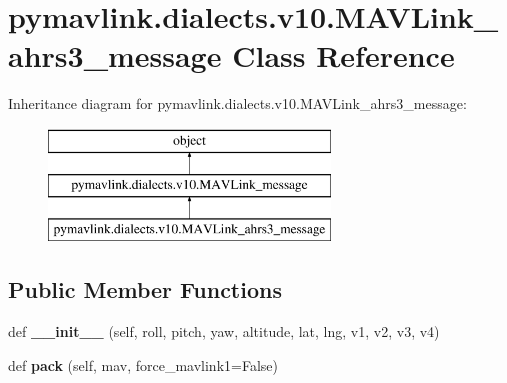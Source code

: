 \hypertarget{classpymavlink_1_1dialects_1_1v10_1_1MAVLink__ahrs3__message}{}\section{pymavlink.\+dialects.\+v10.\+M\+A\+V\+Link\+\_\+ahrs3\+\_\+message Class Reference}
\label{classpymavlink_1_1dialects_1_1v10_1_1MAVLink__ahrs3__message}
Inheritance diagram for pymavlink.\+dialects.\+v10.\+M\+A\+V\+Link\+\_\+ahrs3\+\_\+message\+:\begin{figure}[H]
\begin{center}
\leavevmode
\includegraphics[height=3.000000cm]{classpymavlink_1_1dialects_1_1v10_1_1MAVLink__ahrs3__message}
\end{center}
\end{figure}
\subsection*{Public Member Functions}
\begin{DoxyCompactItemize}
\item 
\mbox{\label{classpymavlink_1_1dialects_1_1v10_1_1MAVLink__ahrs3__message_ab1e7da8d1991f945fa41563eb5943332}} 
def {\bfseries \+\_\+\+\_\+init\+\_\+\+\_\+} (self, roll, pitch, yaw, altitude, lat, lng, v1, v2, v3, v4)
\item 
\mbox{\label{classpymavlink_1_1dialects_1_1v10_1_1MAVLink__ahrs3__message_ab78d5b6286dc1d6ea82d064d87cf32ce}} 
def {\bfseries pack} (self, mav, force\+\_\+mavlink1=False)
\end{DoxyCompactItemize}
